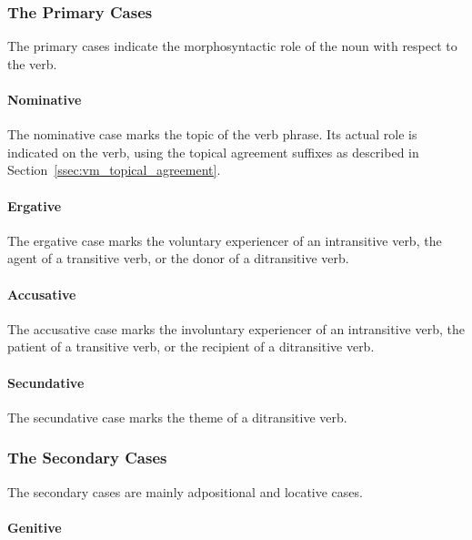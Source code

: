 \documentclass[grammar]{subfiles}
\begin{document}
	\subsubsection{The Primary Cases}
	\label{sssec:nm_primary_cases}

	The primary cases indicate the morphosyntactic role of the noun with respect to the verb.

	\paragraph{Nominative}
	\label{par:nm_nominative_case}

	The nominative case marks the topic of the verb phrase. Its actual role is indicated on the verb, using the topical agreement suffixes as described in Section~\ref{ssec:vm_topical_agreement}.

	\paragraph{Ergative}
	\label{par:nm_ergative_case}

	The ergative case marks the voluntary experiencer of an intransitive verb, the agent of a transitive verb, or the donor of a ditransitive verb.

	\paragraph{Accusative}
	\label{par:nm_accusative_case}

	The accusative case marks the involuntary experiencer of an intransitive verb, the patient of a transitive verb, or the recipient of a ditransitive verb.

	\paragraph{Secundative}
	\label{par:nm_secundative_case}

	The secundative case marks the theme of a ditransitive verb.

	\subsubsection{The Secondary Cases}
	\label{sssec:nm_secondary_cases}

	The secondary cases are mainly adpositional and locative cases.

	\paragraph{Genitive}
	\label{par:nm_genitive_case}
\end{document}
